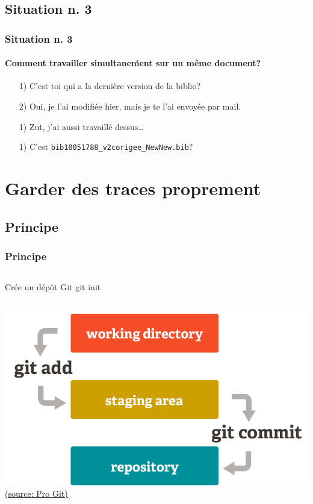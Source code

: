 \documentclass[t,11pt]{beamer}
\begin{document}
\subsection{Situation n. 3}
\begin{frame}[label=sit3,c]
        \frametitle{Situation n. 3}
        \framesubtitle{Comment travailler simultane\'ment sur un même document?}
        \begin{semiverbatim}
        \begin{itemize}
                \item[1)] C'est toi qui a la dernière version de la biblio?
                \item[2)] Oui, je l'ai modifiée hier, mais je te l'ai envoyée par mail. 
                \item[1)] Zut, j'ai aussi travaillé dessus\ldots
                \item[1)] C'est \texttt{bib10051788\_v2corigee\_NewNew.bib}?
        \end{itemize}
        \end{semiverbatim}
\end{frame}

\section{Garder des traces proprement}

\subsection{Principe}
\begin{frame}[c]
        \frametitle{Principe}
        \begin{columns}
                \begin{block}{Cr\'ee un d\'ep\^ot Git}
                        \centering
                        git init
                \end{block}
        \end{columns}
        \begin{center}
                \hspace{1.1cm}
                \includegraphics[width=0.5\linewidth]{./img/git_staging_area}
                \newline
                \hspace*{15pt}
                \href{https://git-scm.com/about/staging-area}{{\tiny (source: Pro Git)}}
        \end{center}
\end{frame}
\end{document}
